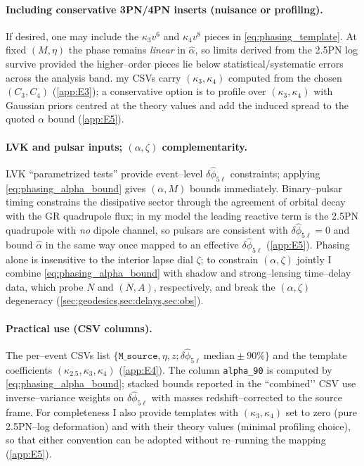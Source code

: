 \documentclass{iopjournal}
\begin{document}
\paragraph{Including conservative 3PN/4PN inserts (nuisance or profiling).}
If desired, one may include the $\kappa_{3}v^{6}$ and $\kappa_{4}v^{8}$ pieces in \eqref{eq:phasing_template}. At fixed $(M,\eta)$ the phase remains \emph{linear} in $\widehat\alpha$, so limits derived from the 2.5PN log survive provided the higher–order pieces lie below statistical/systematic errors across the analysis band. my CSVs carry $(\kappa_{3},\kappa_{4})$ computed from the chosen $(C_{3},C_{4})$ (\cref{app:E3}); a conservative option is to profile over $(\kappa_{3},\kappa_{4})$ with Gaussian priors centred at the theory values and add the induced spread to the quoted $\alpha$ bound (\cref{app:E5}).

\paragraph{LVK and pulsar inputs; $(\alpha,\zeta)$ complementarity.}
LVK ``parametrized tests” provide event–level $\delta\hat\phi_{5\ell}$ constraints; applying \eqref{eq:phasing_alpha_bound} gives $(\alpha,M)$ bounds immediately. Binary–pulsar timing constrains the dissipative sector through the agreement of orbital decay with the GR quadrupole flux; in my model the leading reactive term is the 2.5PN quadrupole with \emph{no} dipole channel, so pulsars are consistent with $\delta\hat\phi_{5\ell}=0$ and bound $\widehat\alpha$ in the same way once mapped to an effective $\delta\hat\phi_{5\ell}$ (\cref{app:E5}). Phasing alone is insensitive to the interior lapse dial $\zeta$; to constrain $(\alpha,\zeta)$ jointly I combine \eqref{eq:phasing_alpha_bound} with shadow and strong–lensing time–delay data, which probe $N$ and $(N,A)$, respectively, and break the $(\alpha,\zeta)$ degeneracy (\cref{sec:geodesics,sec:delays,sec:obs}).

\paragraph{Practical use (CSV columns).}
The per–event CSVs list $\{\texttt{M\_source},\eta,z; \delta\hat\phi_{5\ell}\ \text{median}\pm90\%\}$ and the template coefficients $(\kappa_{2.5},\kappa_{3},\kappa_{4})$ (\cref{app:E4}). The column \texttt{alpha\_90} is computed by \eqref{eq:phasing_alpha_bound}; stacked bounds reported in the ``combined’’ CSV use inverse–variance weights on $\delta\hat\phi_{5\ell}$ with masses redshift–corrected to the source frame. For completeness I also provide templates with $(\kappa_{3},\kappa_{4})$ set to zero (pure 2.5PN–log deformation) and with their theory values (minimal profiling choice), so that either convention can be adopted without re–running the mapping (\cref{app:E5}).
\end{document}

